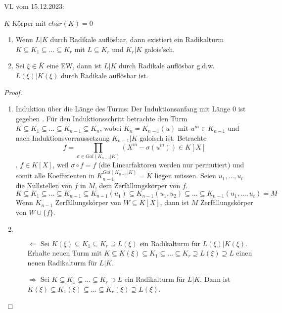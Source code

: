 \documentclass[../main.tex]{subfiles}
\begin{document}
\begin{flushright}
VL vom 15.12.2023:
\end{flushright}
\begin{lemma}\label{theo:3.24}
    $K$ Körper mit $char(K)=0$
    \begin{enumerate}[label=\alph*)]
        \item Wenn $L|K$ durch Radikale auflösbar, dann existiert ein Radikalturm $K\subseteq K_1\subseteq\dots\subseteq K_r$ mit $L\subseteq K_r$ und $K_r|K$ galois'sch.
        \item Sei $\xi \in \overline{K}$  eine EW, dann ist $L|K$ durch Radikale auflösbar g.d.w. $L(\xi)|K(\xi)$ durch Radikale auflösbar ist.
    \end{enumerate}
\end{lemma}
\begin{proof}
    \begin{enumerate}[label=\alph*)]
        \item Induktion über die Länge des Turms:
        Der Induktionsanfang mit Länge $0$ ist gegeben \checkmark.
        Für den Induktionsschritt betrachte den Turm $K\subseteq K_1\subseteq\dots\subseteq K_{n-1}\subseteq K_n$, wobei $K_n = K_{n-1}(u)$ mit $u^m \in K_{n-1}$ und nach Induktionsvorraussetzung $K_{n-1}|K$ galoisch ist.
        Betrachte $$f = \prod_{\sigma\in Gal(K_{n-1}|K)} \left(X^m-\sigma(u^m)\right)\in K[X]$$.
        $f\in K[X]$, weil $\sigma\circ f=f$ (die Linearfaktoren werden nur permutiert) und somit alle Koeffizienten in $K_{n-1}^{Gal(K_{n-1}|K)}=K$ liegen müssen.
        Seien $u_1,\dots,u_t$ die Nullstellen von $f$ in $M$, dem Zerfällungskörper von $f$.
        $$K\subseteq K_1\subseteq\dots\subseteq K_{n-1}\subseteq K_{n-1}(u_1)\subseteq K_{n-1}(u_1,u_2)\subseteq\dots\subseteq K_{n-1}(u_1,\dots,u_t)=M$$
        Wenn $K_{n-1}$ Zerfällungskörper von $W\subseteq K[X]$, dann ist $M$ Zerfällungskörper von $W\cup \{f\}$.
        
        \item $ $
        \begin{itemize}
            \item[$\Leftarrow$] Sei $K(\xi) \subseteq K_1\subseteq K_r\supseteq L(\xi)$ ein Radikalturm für $L(\xi)|K(\xi)$.
            Erhalte neuen Turm mit $K\subseteq K(\xi)\subseteq K_1\subseteq\dots\subseteq K_r \supseteq L(\xi)\supseteq L$ einen neuen Radikalturm für $L|K$.
            \item[$\Rightarrow$]
            Sei $K\subseteq K_1\subseteq \dots\subseteq K_r\supset L$ ein Radikalturm für $L|K$.
            Dann ist $K(\xi)\subseteq K_1(\xi)\subseteq\dots\subseteq K_r(\xi)\supseteq L(\xi)$.
        \end{itemize}
    \end{enumerate}
\end{proof}
\end{document}
